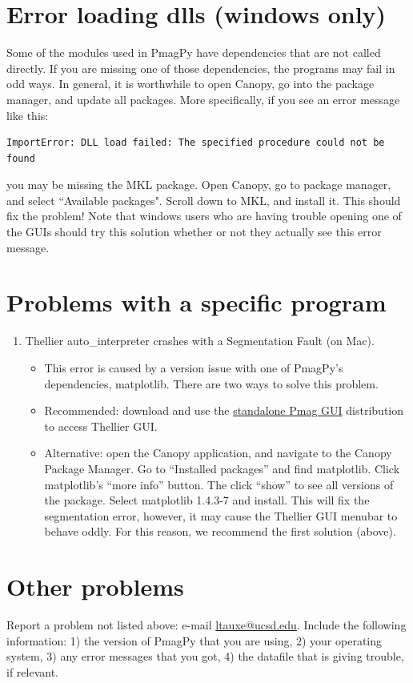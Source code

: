 \documentclass[11pt]{book}
\begin{document}
{{{{{{\section{Error loading dlls (windows only)}
Some of the modules used in PmagPy have dependencies that are not called directly.  If you are missing one of those dependencies, the programs may fail in odd ways.  In general, it is worthwhile to open Canopy, go into the package manager, and update all packages.  More specifically, if you see an error message like this: \begin{verbatim}ImportError: DLL load failed: The specified procedure could not be found  \end{verbatim} you may be missing the MKL package.  Open Canopy, go to package manager, and select ``Available packages".  Scroll down to MKL, and install it.  This should fix the problem!  Note that windows users who are having trouble opening one of the GUIs should try this solution whether or not they actually see this error message.


\section{Problems with a specific program}
\begin{enumerate}
\item Thellier auto\_interpreter crashes with a Segmentation Fault (on Mac).
  \begin{itemize}
  \item This error is caused by a version issue with one of PmagPy's dependencies, matplotlib.  There are two ways to solve this problem.
  \item Recommended: download and use the \href{#standalone}{standalone Pmag GUI} distribution to access Thellier GUI.
  \item Alternative: open the Canopy application, and navigate to the Canopy Package Manager.  Go to ``Installed packages'' and find matplotlib.  Click matplotlib's ``more info'' button.  The click ``show'' to see all versions of the package.  Select matplotlib 1.4.3-7 and install.  This will fix the segmentation error, however, it may cause the Thellier GUI menubar to behave oddly.  For this reason, we recommend the first solution (above).
  \end{itemize}
\end{enumerate}

\section{Other problems}Report a problem not listed above: e-mail \href{mailto:ltauxe@ucsd.edu}{ltauxe@ucsd.edu}. Include the following information: 1) the version of PmagPy that you are using, 2) your operating system, 3) any error messages that you got, 4) the datafile that is giving trouble, if relevant.




}}}}}}
\end{document}
